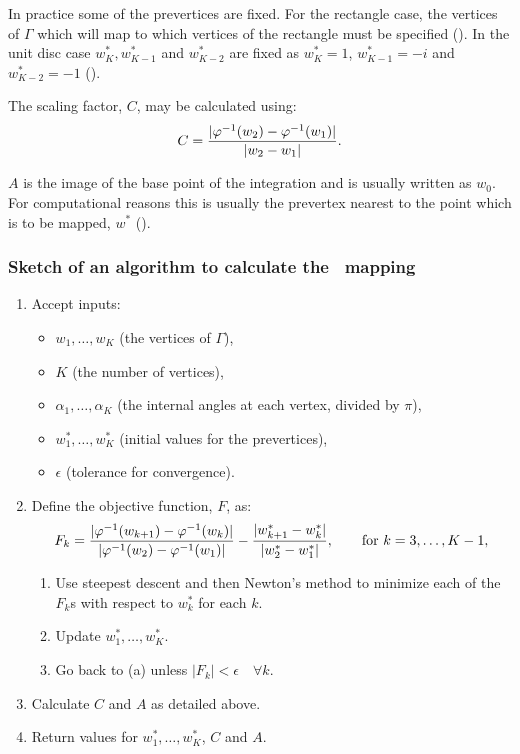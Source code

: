 \label{cor-3s18-2}In practice some of the prevertices are fixed. For the rectangle case, the vertices of $\Gamma$ which will map to which vertices of the rectangle must be specified (\cite[p. 48]{driscoll}). In the unit disc case $w^*_K, w^*_{K-1}$ and $w^*_{K-2}$ are fixed as $w^*_K=1$, $w^*_{K-1}=-i$ and $w^*_{K-2}=-1$ (\cite[p. 24]{driscoll}). 

The scaling factor, $C$, may be calculated using:
\begin{equation}
C=\frac{\vert \varphi^{-1}(w_2)-\varphi^{-1}(w_1)\vert}{\vert w_2 - w_1\vert}.
\end{equation}
\label{cor-r29-6}\label{cor-3s19}%

$A$ is the image of the base point of the integration and is usually written as $w_0$. For computational reasons this is usually the prevertex nearest to the point which is to be mapped\label{cor-3s18-1}, $w^*$ (\cite[p. 27]{driscoll}).


\subsubsection{Sketch of an algorithm to calculate the \sch\ mapping}
\label{algorithmsketch}
\label{cor-e7}
\begin{enumerate}
\item Accept inputs:
   \begin{itemize} 
      \item $w_1,\dots,w_K$ (the vertices of $\Gamma$),
      \item $K$ (the number of vertices),
      \item $\alpha_1,\dots,\alpha_K$ (the internal angles at each vertex, divided by $\pi$),
      \item \label{cor-3s20}$w^*_1,\dots,w^*_K$ (initial values for the prevertices),
      \item $\epsilon$ (tolerance for convergence).
   \end{itemize}
\item Define the objective function, $F$, as:
 \begin{equation*}
F_k=\frac{\vert \varphi^{-1}(w_{k+1}) -  \varphi^{-1}(w_k) \vert}{\vert \varphi^{-1}(w_2)-\varphi^{-1}(w_1)\vert} - \frac{\vert w^*_{k+1} - w^*_k\vert}{\vert w^*_2 - w^*_1\vert}, \qquad \text{for } k=3,\dots,K-1,
 \end{equation*}
\begin{enumerate}
\item Use steepest descent and then Newton's method to minimize each of the $F_k$s with respect to $w^*_k$ for each $k$.
\item Update $w^*_1,\dots,w^*_K$.
\item Go back to (a) unless $\vert F_k \vert < \epsilon \quad \forall k$. 
\end{enumerate}
\item Calculate $C$ and $A$ as detailed above.
\item Return values for $w^*_1,\dots,w^*_K$, $C$ and $A$.
\end{enumerate}

